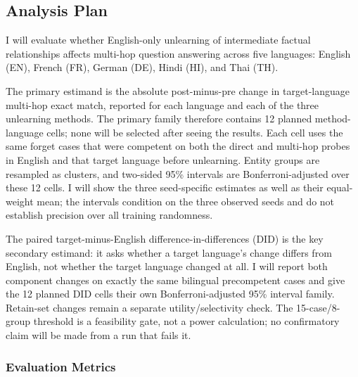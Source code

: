 \documentclass[10pt,a4paper]{article}
\begin{document}
\subsection{Analysis Plan}

I will evaluate whether English-only unlearning of
intermediate factual relationships affects multi-hop
question answering across five languages: English (EN),
French (FR), German (DE), Hindi (HI), and Thai (TH).

The primary estimand is the absolute post-minus-pre change
in target-language multi-hop exact match, reported for each
language and each of the three unlearning methods. The
primary family therefore contains 12 planned method-language
cells; none will be selected after seeing the results. Each
cell uses the same forget cases that were competent on both
the direct and multi-hop probes in English and that target
language before unlearning. Entity groups are resampled as
clusters, and two-sided 95\% intervals are Bonferroni-adjusted
over these 12 cells. I will show the three seed-specific
estimates as well as their equal-weight mean; the intervals
condition on the three observed seeds and do not establish
precision over all training randomness.

The paired target-minus-English difference-in-differences
(DID) is the key secondary estimand: it asks whether a target
language's change differs from English, not whether the target
language changed at all. I will report both component changes
on exactly the same bilingual precompetent cases and give the
12 planned DID cells their own Bonferroni-adjusted 95\%
interval family. Retain-set changes remain a separate
utility/selectivity check. The 15-case/8-group threshold is a
feasibility gate, not a power calculation; no confirmatory
claim will be made from a run that fails it.

\subsubsection*{Evaluation Metrics}
\end{document}
